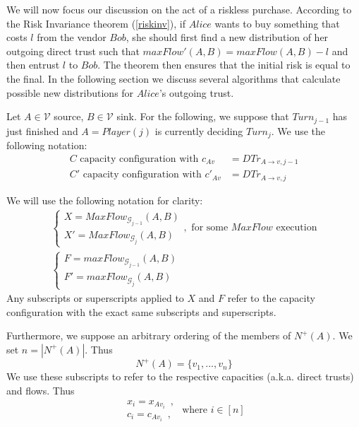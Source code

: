We will now focus our discussion on the act of a riskless purchase. According to the Risk Invariance theorem (\ref{riskinv}),
if $Alice$ wants to buy something that costs $l$ from the vendor $Bob$, she should first find a new distribution of her
outgoing direct trust such that $maxFlow'\left(A, B\right) = maxFlow\left(A, B\right) - l$ and then entrust $l$ to $Bob$.
The theorem then ensures that the initial risk is equal to the final. In the following section we discuss several algorithms
that calculate possible new distributions for $Alice$'s outgoing trust.

Let $A \in \mathcal{V}$ source, $B \in \mathcal{V}$ sink. For the following, we suppose that $Turn_{j-1}$ has just finished
and $A = Player\left(j\right)$ is currently deciding $Turn_j$. We use the following notation:
\begin{align*}
  C \mbox{ capacity configuration with } c_{Av} &= DTr_{A \rightarrow v, j-1} \\
  C' \mbox{ capacity configuration with } c'_{Av} &= DTr_{A \rightarrow v, j}
\end{align*}

We will use the following notation for clarity:
\begin{equation*}
\begin{gathered}
  \begin{cases}
    X = MaxFlow_{\mathcal{G}_{j-1}}\left(A, B\right) \\
    X' = MaxFlow_{\mathcal{G}_j}\left(A, B\right)
  \end{cases}, \mbox{ for some } MaxFlow \mbox{ execution} \\
  \begin{cases}
    F = maxFlow_{\mathcal{G}_{j-1}}\left(A, B\right) \\
    F' = maxFlow_{\mathcal{G}_j}\left(A, B\right)
  \end{cases}
\end{gathered}
\end{equation*}
Any subscripts or superscripts applied to $X$ and $F$ refer to the capacity configuration with the exact same subscripts and
superscripts.

Furthermore, we suppose an arbitrary ordering of the members of $N^{+}\left(A\right)$. We set $n = |N^{+}\left(A\right)|$.
Thus
\begin{equation*}
  N^{+}\left(A\right) = \{v_1, ..., v_n\}
\end{equation*}
We use these subscripts to refer to the respective capacities (a.k.a. direct trusts) and flows. Thus
\begin{equation*}
  \begin{array}{l}
    x_i = x_{Av_i} \enspace, \\
    c_i = c_{Av_i} \enspace,
  \end{array}
  \mbox{ where } i \in [n]
\end{equation*}
